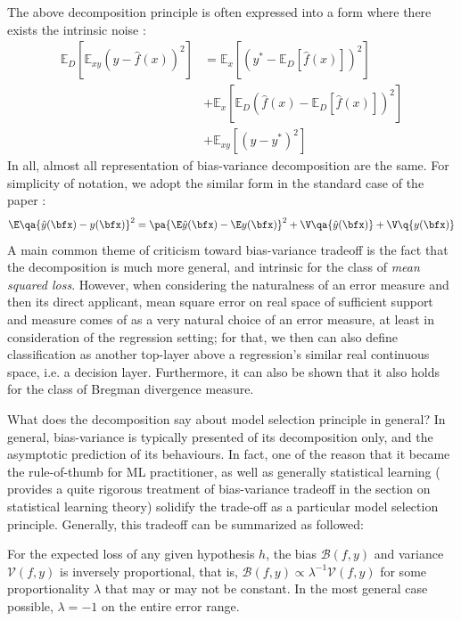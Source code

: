 \documentclass[
  journal=largetwo,
  year=2025,
  volume=37,
]{cup-journal}
\begin{document}
The above decomposition principle is often expressed into a form where there exists the intrinsic noise \cite{brown2024biasvariance}: 
\begin{equation}
    \begin{split}
        \mathbb{E}_D \left[ \mathbb{E}_{xy} \left( y - \hat{f}(x) \right)^2 \right]
        &= 
         \mathbb{E}_x \left[ \left( y^* - \mathbb{E}_D[\hat{f}(x)] \right)^2 \right]\\
        &+ \mathbb{E}_x \left[ \mathbb{E}_D \left( \hat{f}(x) - \mathbb{E}_D[\hat{f}(x)] \right)^2 \right] \\
        &+ \mathbb{E}_{xy} \left[ \left( y - y^* \right)^2 \right]
    \end{split}
    \end{equation}
In all, almost all representation of bias-variance decomposition are the same. For simplicity of notation, we adopt the similar form in the standard case of the paper \cite{adlam2020understandingdoubledescentrequires}: 
\begin{equation}
    \E \qa{\hat{y}(\bfx)-y(\bfx)}^2 = \pa{\E\hat{y}(\bfx) - \E y(\bfx)}^2 + \V\qa{\hat{y}(\bfx)} + \V\q{y(\bfx)}
\end{equation}
A main common theme of criticism toward bias-variance tradeoff is the fact that the decomposition is much more general, and intrinsic for the class of \textit{mean squared loss}. However, when considering the naturalness of an error measure and then its direct applicant, mean square error on real space of sufficient support and measure comes of as a very natural choice of an error measure, at least in consideration of the regression setting; for that, we then can also define classification as another top-layer above a regression's similar real continuous space, i.e. a decision layer. Furthermore, it can also be shown \cite{brown2024biasvariance,PfauBregmanDivergence} that it also holds for the class of Bregman divergence measure. 

What does the decomposition say about model selection principle in general? In general, bias-variance is typically presented of its decomposition only, and the asymptotic prediction of its behaviours. In fact, one of the reason that it became the rule-of-thumb for ML practitioner, as well as generally statistical learning (\cite{lafon_understanding_2024} provides a quite rigorous treatment of bias-variance tradeoff in the section on statistical learning theory) solidify the trade-off as a particular model selection principle. Generally, this tradeoff can be summarized as followed: 
\begin{theorem}\label{thm:bias-variance}
    For the expected loss of any given hypothesis $h$, the bias $\mathcal{B}(f,y)$ and variance $\mathcal{V}(f,y)$ is inversely proportional, that is, $\mathcal{B}(f,y)\propto \lambda^{-1} \mathcal{V}(f,y)$ for some proportionality $\lambda$ that may or may not be constant. In the most general case possible, $\lambda = -1$ on the entire error range. 
\end{theorem}
\end{document}
